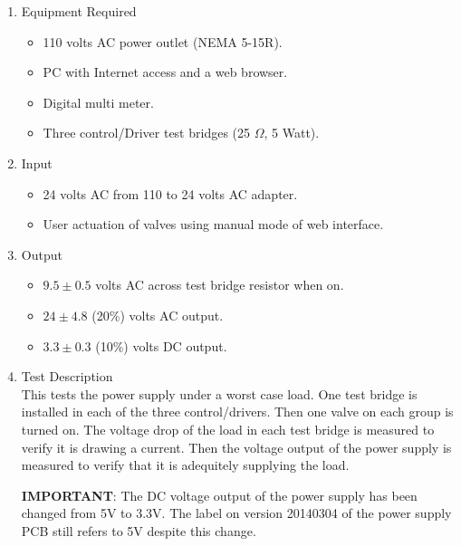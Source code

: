 \documentclass{article}
\begin{document}
\begin{enumerate}
\item Equipment Required
	\begin{itemize}
	\item 110 volts AC power outlet (NEMA 5-15R).
	\item PC with Internet access and a web browser.
	\item Digital multi meter.
	\item Three control/Driver test bridges (25 $\Omega$, 5 Watt).
	\end{itemize}
\item Input
	\begin{itemize}
	\item 24 volts AC from 110 to 24 volts AC adapter.
	\item User actuation of valves using manual mode of web interface.
	\end{itemize}
\item Output
	\begin{itemize}
	\item $9.5\pm0.5$ volts AC across test bridge resistor when on.
	\item $24\pm4.8$ (20\%) volts AC output.
	\item $3.3\pm0.3$ (10\%) volts DC output.
	\end{itemize}
\item Test Description \\

This tests the power supply under a worst case load.
One test bridge is installed in each of the three control/drivers.
Then one valve on each group is turned on.
The voltage drop of the load in each test bridge is measured to
verify it is drawing a current.
Then the voltage output of the power supply is measured to verify
that it is adequitely supplying the load.

\begin{framed}
\textbf{IMPORTANT}: The DC voltage output of the power supply has
been changed from 5V to 3.3V.
The label on version 20140304 of the power supply PCB still
refers to 5V despite this change.
\end{framed}


\end{enumerate}
\end{document}

